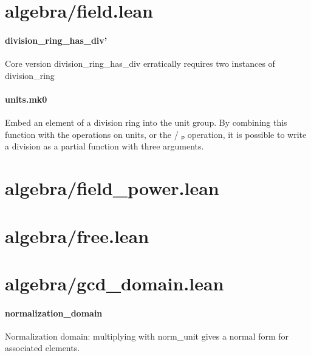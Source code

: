 \documentclass{article}
\begin{document}
\section{algebra/field.lean}\paragraph{division\_ring\_has\_div'}
\par
Core version 
\colorbox[RGB]{253,246,227}{{{{\color[RGB]{101, 123, 131} division\_ring\_has\_div }}}} erratically requires two instances of 
\colorbox[RGB]{253,246,227}{{{{\color[RGB]{101, 123, 131} division\_ring }}}}\paragraph{units.mk0}
\par
Embed an element of a division ring into the unit group.
By combining this function with the operations on units,
or the 
\colorbox[RGB]{253,246,227}{{{{\color[RGB]{181, 137, 0} / }}}{{{\color[RGB]{101, 123, 131} ₚ }}}} operation, it is possible to write a division
as a partial function with three arguments.
\section{algebra/field\_power.lean}\section{algebra/free.lean}\section{algebra/gcd\_domain.lean}\paragraph{normalization\_domain}
\par
Normalization domain: multiplying with 
\colorbox[RGB]{253,246,227}{{{{\color[RGB]{101, 123, 131} norm\_unit }}}} gives a normal form for associated elements.
\end{document}
